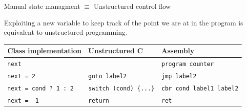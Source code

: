\documentclass[aspectratio=169,11pt]{beamer}
\begin{document}



\begin{frame}[fragile]{Manual state managment $\equiv$ Unstructured control flow}

Exploiting a new variable to keep track of the point we are at in the program is equivalent to unstructured programming.
    \begin{table}[h]
\centering
\begin{tabular}{|l|l|l|}
\hline
\textbf{Class implementation} & \textbf{Unstructured C} & \textbf{Assembly} \\
\hline
\texttt{next} &  & \texttt{program counter} \\
\texttt{next = 2} & \texttt{goto label2} & \texttt{jmp label2} \\
\texttt{next = cond ? 1 : 2} & \texttt{switch (cond) \{...\}} & \texttt{cbr cond label1 label2} \\
\texttt{next = -1} & \texttt{return} & \texttt{ret} \\
\hline
\end{tabular}


\end{table}


\end{frame}
\end{document}
